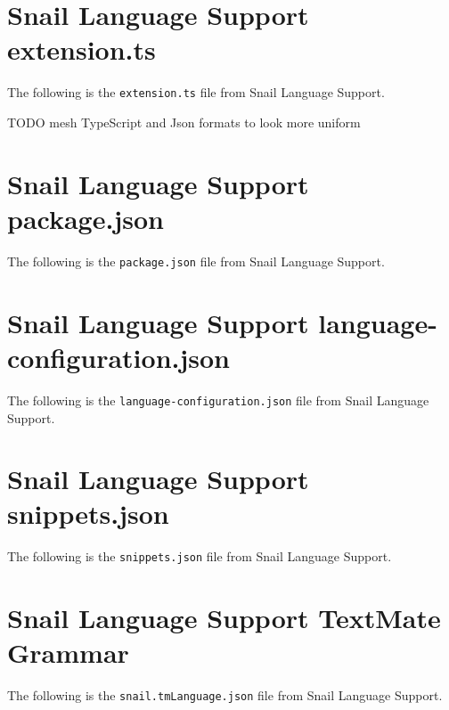 \documentclass{article}
\begin{document}
\newpage




\newpage

\begin{appendices}

\section{Snail Language Support extension.ts}

    The following is the \lstinline{extension.ts} file from Snail Language Support.

    TODO mesh TypeScript and Json formats to look more uniform

    
    \label{app:extension-ts}

\section{Snail Language Support package.json}

    The following is the \lstinline{package.json} file from Snail Language Support.
    
    \label{app:package-json}

\newpage
\section{Snail Language Support language-configuration.json}

    The following is the \lstinline{language-configuration.json} file from Snail Language Support.
    
    \label{app:language-configuration}

\newpage
\section{Snail Language Support snippets.json}

    The following is the \lstinline{snippets.json} file from Snail Language Support.
    
    \label{app:snippets-json}

\newpage
\section{Snail Language Support TextMate Grammar}

    The following is the \lstinline{snail.tmLanguage.json} file from Snail Language Support.
    
    \label{app:snail-tmLanguage}
\end{appendices}
\end{document}
